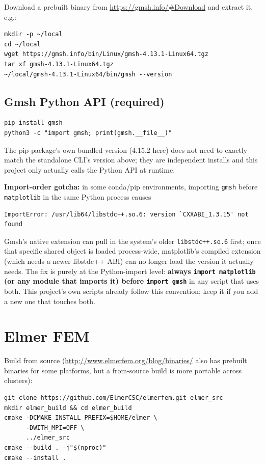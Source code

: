 \documentclass[11pt]{article}
\begin{document}
Download a prebuilt binary from \url{https://gmsh.info/#Download} and
extract it, e.g.:

\begin{lstlisting}
mkdir -p ~/local
cd ~/local
wget https://gmsh.info/bin/Linux/gmsh-4.13.1-Linux64.tgz
tar xf gmsh-4.13.1-Linux64.tgz
~/local/gmsh-4.13.1-Linux64/bin/gmsh --version
\end{lstlisting}

\subsection{Gmsh Python API (required)}

\begin{lstlisting}
pip install gmsh
python3 -c "import gmsh; print(gmsh.__file__)"
\end{lstlisting}

The pip package's own bundled version (4.15.2 here) does not need to
exactly match the standalone CLI's version above; they are independent
installs and this project only actually calls the Python API at runtime.

\textbf{Import-order gotcha:} in some conda/pip environments, importing
\texttt{gmsh} before \texttt{matplotlib} in the same Python process
causes
\begin{lstlisting}
ImportError: /usr/lib64/libstdc++.so.6: version `CXXABI_1.3.15' not found
\end{lstlisting}
Gmsh's native extension can pull in the system's older
\texttt{libstdc++.so.6} first; once that specific shared object is loaded
process-wide, matplotlib's compiled extension (which needs a newer
libstdc++ ABI) can no longer load the version it actually needs. The fix
is purely at the Python-import level: \textbf{always \texttt{import
matplotlib} (or any module that imports it) before \texttt{import gmsh}}
in any script that uses both. This project's own scripts already follow
this convention; keep it if you add a new one that touches both.

\section{Elmer FEM}

Build from source (\url{http://www.elmerfem.org/blog/binaries/} also has
prebuilt binaries for some platforms, but a from-source build is more
portable across clusters):

\begin{lstlisting}
git clone https://github.com/ElmerCSC/elmerfem.git elmer_src
mkdir elmer_build && cd elmer_build
cmake -DCMAKE_INSTALL_PREFIX=$HOME/elmer \
      -DWITH_MPI=OFF \
      ../elmer_src
cmake --build . -j"$(nproc)"
cmake --install .
\end{lstlisting}
\end{document}
